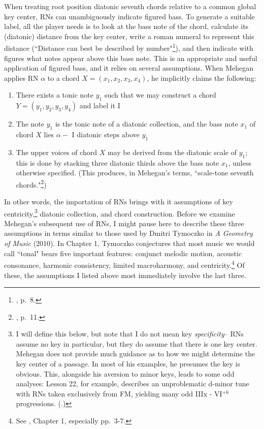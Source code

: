 When treating root position diatonic seventh chords relative to a common global key center, RNs can unambiguously indicate figured bass.  To generate a suitable label, all the player needs is to look at the bass note of the chord, calculate its (diatonic) distance from the key center, write a roman numeral to represent this distance (``Distance can best be described by number"\footnote{\cite{mehegan1959}, p.\ 8.}), and then indicate with figures what notes appear above this bass note.  This is an appropriate and useful application of figured bass, and it relies on several assumptions.  When Mehegan applies RN $\alpha$ to a chord $X = (x_1,x_2,x_3,x_4)$, he implicitly claims the following:\
\begin{enumerate}
	\item There exists a tonic note $y_1$ such that we may construct a chord $Y = (y_1,y_2,y_3,y_4)$ and label it I
	\item The note $y_1$ is the tonic note of a diatonic collection, and the bass note $x_1$ of chord $X$ lies $\alpha -$ I diatonic steps above $y_1$
	\item The upper voices of chord $X$ may be derived from the diatonic scale of $y_1$; this is done by stacking three diatonic thirds above the bass note $x_1$, unless otherwise specified.  (This produces, in Mehegan's terms, ``scale-tone seventh chords."\footnote{\cite{mehegan1959}, p.\ 11.})
\end{enumerate}
In other words, the importation of RNs brings with it assumptions of key centricity,\footnote{I will define this below, but note that I do not mean key \emph{specificity}-- RNs assume no key in particular, but they do assume that there is one key center. Mehegan does not provide much guidance as to how we might determine the key center of a passage.  In most of his examples, he presumes the key is obvious.  This, alongside his aversion to minor keys, leads to some odd analyses: Lesson 22, for example, describes an unproblematic d-minor tune with RNs taken exclusively from FM, yielding many odd IIIx - VI$^{+6}$ progressions.  (\cite{mehegan1959}.)} diatonic collection, and chord construction.  Before we examine Mehegan's subsequent use of RNs, I might pause here to describe these three assumptions in terms similar to those used by Dmitri Tymoczko in \emph{A Geometry of Music} (2010).  In Chapter 1, Tymoczko conjectures that most music we would call ``tonal" bears five important features: conjunct melodic motion, acoustic consonance, harmonic consistency, limited macroharmony, and centricity.\footnote{See \cite{tymoczko2010}, Chapter 1, especially pp.\ 3-7.}  Of these, the assumptions I listed above most immediately involve the last three.

